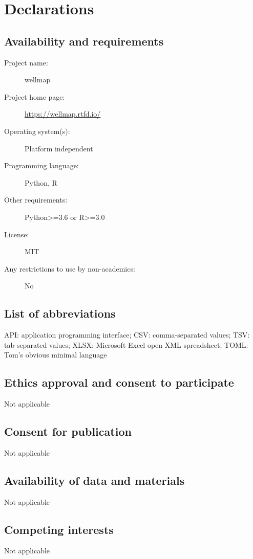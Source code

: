 \documentclass{bmcart}
\begin{document}
\section*{Declarations}

\subsection*{Availability and requirements}
\begin{description}
\item [Project name:] wellmap
\item [Project home page:] \url{https://wellmap.rtfd.io/}
\item [Operating system(s):] Platform independent
\item [Programming language:] Python, R
\item [Other requirements:] Python\textgreater=3.6 or R\textgreater=3.0
\item [License:] MIT
\item [Any restrictions to use by non-academics:] No
\end{description}

\subsection*{List of abbreviations}

API: application programming interface; CSV: comma-separated values;
TSV: tab-separated values; XLSX: Microsoft Excel open XML spreadsheet;
TOML: Tom's obvious minimal language

\subsection*{Ethics approval and consent to participate}
Not applicable

\subsection*{Consent for publication}
Not applicable

\subsection*{Availability of data and materials}
Not applicable

\subsection*{Competing interests}
Not applicable
\end{document}
